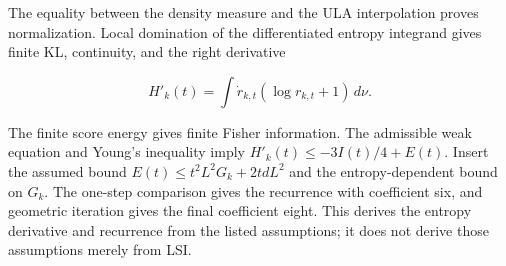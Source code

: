 \documentclass[11pt,a4paper]{report}
\begin{document}
The equality between the density measure and the ULA interpolation proves normalization. Local domination of the differentiated entropy integrand gives finite KL, continuity, and the right derivative

\[H'_k(t)=\int\dot r_{k,t}(\log r_{k,t}+1)\,d\nu.\]

The finite score energy gives finite Fisher information. The admissible weak equation and Young's inequality imply \(H'_k(t)\le-3I(t)/4+E(t)\). Insert the assumed bound \(E(t)\le t^2L^2G_k+2tdL^2\) and the entropy-dependent bound on \(G_k\). The one-step comparison gives the recurrence with coefficient six, and geometric iteration gives the final coefficient eight. This derives the entropy derivative and recurrence from the listed assumptions; it does not derive those assumptions merely from LSI.
\end{document}
